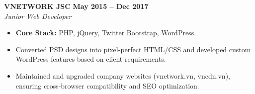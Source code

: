\documentclass[11pt,a4paper]{article}
\begin{document}
\vspace{8pt}

\noindent \textbf{VNETWORK JSC} \hfill \textbf{May 2015 -- Dec 2017} \\
\textit{Junior Web Developer}
\begin{itemize}
    \item \textbf{Core Stack:} PHP, jQuery, Twitter Bootstrap, WordPress.
    \item Converted PSD designs into pixel-perfect HTML/CSS and developed custom WordPress features based on client requirements.
    \item Maintained and upgraded company websites (vnetwork.vn, vncdn.vn), ensuring cross-browser compatibility and SEO optimization.
\end{itemize}
\end{document}
